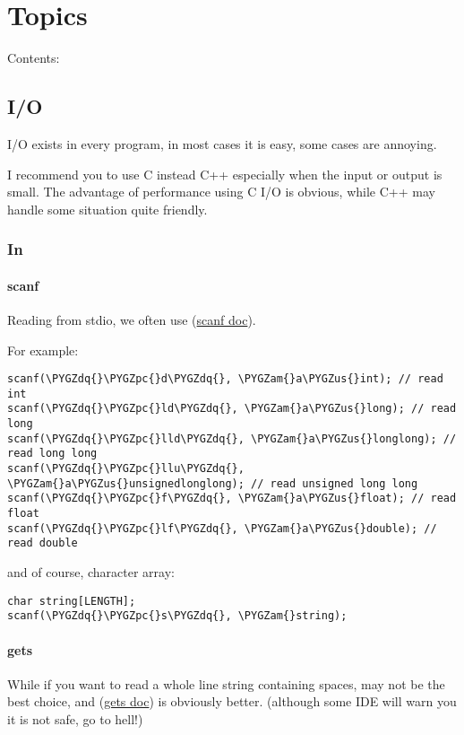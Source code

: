 \documentclass[letterpaper,10pt,english]{sphinxmanual}
\def\PYGZus{\char`\_}
\def\PYGZam{\char`\&}
\def\PYGZpc{\char`\%}
\def\PYGZdq{\char`\"}
\begin{document}
\chapter{Topics}
\label{topics:topics}\label{topics::doc}
Contents:


\section{I/O}
\label{topics/io::doc}\label{topics/io:i-o}
I/O exists in every program, in most cases it is easy, some cases are annoying.

I recommend you to use C instead C++ especially when the input or output is small.
The advantage of performance using C I/O is obvious, while C++ may handle some
situation quite friendly.


\subsection{In}
\label{topics/io:in}

\subsubsection{scanf}
\label{topics/io:scanf}
Reading from stdio, we often use  (\href{http://en.cppreference.com/w/cpp/io/c/fscanf}{scanf doc}).

For example:

\begin{Verbatim}[commandchars=\\\{\}]
scanf(\PYGZdq{}\PYGZpc{}d\PYGZdq{}, \PYGZam{}a\PYGZus{}int); // read int
scanf(\PYGZdq{}\PYGZpc{}ld\PYGZdq{}, \PYGZam{}a\PYGZus{}long); // read long
scanf(\PYGZdq{}\PYGZpc{}lld\PYGZdq{}, \PYGZam{}a\PYGZus{}longlong); // read long long
scanf(\PYGZdq{}\PYGZpc{}llu\PYGZdq{}, \PYGZam{}a\PYGZus{}unsignedlonglong); // read unsigned long long
scanf(\PYGZdq{}\PYGZpc{}f\PYGZdq{}, \PYGZam{}a\PYGZus{}float); // read float
scanf(\PYGZdq{}\PYGZpc{}lf\PYGZdq{}, \PYGZam{}a\PYGZus{}double); // read double
\end{Verbatim}

and of course, character array:

\begin{Verbatim}[commandchars=\\\{\}]
char string[LENGTH];
scanf(\PYGZdq{}\PYGZpc{}s\PYGZdq{}, \PYGZam{}string);
\end{Verbatim}


\subsubsection{gets}
\label{topics/io:gets}
While if you want to read a whole line string containing spaces,  may not
be the best choice, and  (\href{http://en.cppreference.com/w/cpp/io/c/gets}{gets doc}) is obviously better. (although some IDE will warn
you it is not safe, go to hell!)
\end{document}
